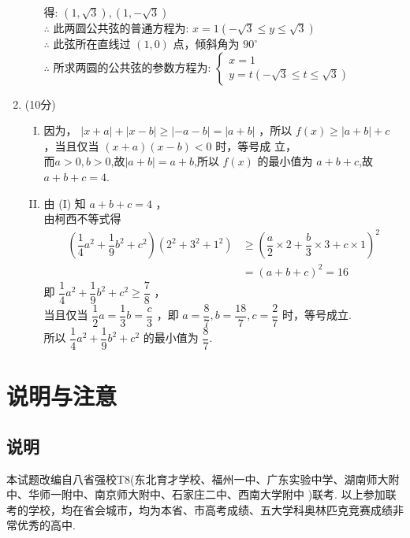 \documentclass[11pt]{article}
\begin{document}
\begin{enumerate}
\begin{enumerate}[(I)]
		得: $(1, \sqrt{3}),(1,-\sqrt{3})$
		\\$\therefore$ 此两圆公共弦的普通方程为: $x=1(-\sqrt{3} \leq y \leq \sqrt{3})$
		\\$\therefore$ 此弦所在直线过 $(1,0)$ 点，倾斜角为 $90^{\circ}$
		\\$\therefore$ 所求两圆的公共弦的参数方程为: $\left\{\begin{array}{l}x=1 \\ y=t(-\sqrt{3} \leq t \leq \sqrt{3})\end{array}\right.$ 
	\end{enumerate}
	\item (10分)
	\begin{enumerate}[(I)]
		\item 因为， $|x+a|+|x-b| \geq|-a-b|=|a+b|$ ，所以 $f(x) \geq|a+b|+c$ ，当且仅当 $(x+a)(x-b)<0$ 时，等号成
		立，
		\\而$a>0, b>0$,故$\left | a+b \right | =a+b$,所以 $f(x)$ 的最小值为 $a+b+c$,故 $a+b+c=4$. 
		\item 由 (I) 知 $a+b+c=4$ ，
		\\由柯西不等式得
		\begin{align*}
			\left(\dfrac{1}{4} a^{2}+\dfrac{1}{9} b^{2}+c^{2}\right)(2^2+3^2+1^2) &\geq\left(\dfrac{a}{2} \times 2+\dfrac{b}{3} \times 3+c \times 1\right)^{2} \\
			&=(a+b+c)^{2}=16
		\end{align*}
		即 $\dfrac{1}{4} a^{2}+\dfrac{1}{9} b^{2}+c^{2} \geq \dfrac{7}{8}$ ，
		\\当且仅当 $\dfrac{1}{2} a=\dfrac{1}{3} b=\dfrac{c}{3}$ ，即 $a=\dfrac{8}{7}, b=\dfrac{18}{7}, c=\dfrac{2}{7}$ 时，等号成立.
		\\所以 $\dfrac{1}{4} a^{2}+\dfrac{1}{9} b^{2}+c^{2}$ 的最小值为 $\dfrac{8}{7}$.
	\end{enumerate}
\end{enumerate}
\section{\heiti 说明与注意}
\subsection{\heiti 说明}
本试题改编自八省强校T8(东北育才学校、福州一中、广东实验中学、湖南师大附中、华师一附中、南京师大附中、石家庄二中、西南大学附中
)联考. 以上参加联考的学校，均在省会城市，均为本省、市高考成绩、五大学科奥林匹克竞赛成绩非常优秀的高中.
\end{document}
